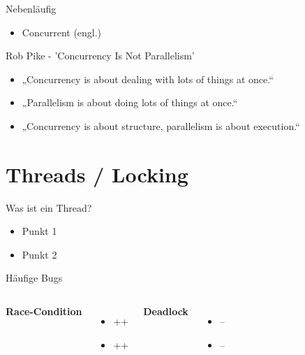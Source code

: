 \documentclass[compress]{beamer}
\begin{document}

  \begin{frame}{Nebenläufig}
    \begin{itemize}
      \item Concurrent (engl.)
    \end{itemize}
  \end{frame}

  \begin{frame}{Rob Pike - 'Concurrency Is Not Parallelism'}
    \begin{itemize}
      \item „Concurrency is about dealing with lots of things at once.“
      \item „Parallelism is about doing lots of things at once.“
      \item „Concurrency is about structure, parallelism is about execution.“
    \end{itemize}
  \end{frame}


\section{Threads / Locking}
  \begin{frame}{Was ist ein Thread?}
    \begin{itemize}
      \item Punkt 1
      \item Punkt 2
    \end{itemize}
  \end{frame}
  
  \begin{frame}{Häufige Bugs}
    \begin{columns}[c]
      \textbf{Race-Condition}
      \begin{itemize}
        \item ++
        \item ++
      \end{itemize}
      \textbf{Deadlock}
      \begin{itemize}
        \item --
        \item --
      \end{itemize}
    \end{columns}
  \end{frame}
  
\end{document}
